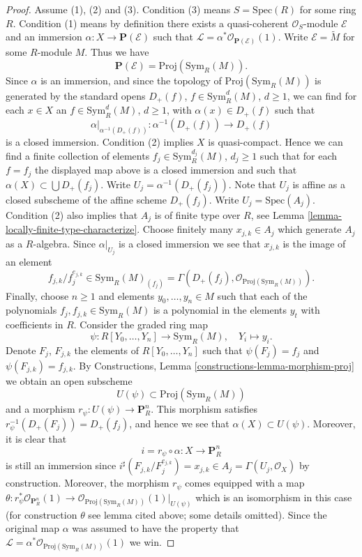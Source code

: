 \begin{proof}
Assume (1), (2) and (3).
Condition (3) means $S = \text{Spec}(R)$ for some ring $R$.
Condition (1) means by definition
there exists a quasi-coherent $\mathcal{O}_S$-module
$\mathcal{E}$ and an immersion $\alpha : X \to \mathbf{P}(\mathcal{E})$
such that $\mathcal{L} = \alpha^*\mathcal{O}_{\mathbf{P}(\mathcal{E})}(1)$.
Write $\mathcal{E} = \widetilde{M}$ for some $R$-module $M$.
Thus we have
$$
\mathbf{P}(\mathcal{E}) = \text{Proj}(\text{Sym}_R(M)).
$$
Since $\alpha$ is an immersion, and since the topology of
$\text{Proj}(\text{Sym}_R(M))$ is generated by the standard
opens $D_{+}(f)$, $f \in \text{Sym}_R^d(M)$, $d \geq 1$,
we can find for each $x \in X$ an
$f \in \text{Sym}_R^d(M)$, $d \geq 1$, with $\alpha(x) \in D_{+}(f)$
such that
$$
\alpha|_{\alpha^{-1}(D_{+}(f))} : \alpha^{-1}(D_{+}(f)) \to D_{+}(f)
$$
is a closed immersion. 
Condition (2) implies $X$ is quasi-compact. Hence we can find
a finite collection of elements
$f_j \in \text{Sym}_R^{d_j}(M)$, $d_j \geq 1$
such that for each $f = f_j$ the displayed map above
is a closed immersion and such that $\alpha(X) \subset \bigcup D_{+}(f_j)$.
Write $U_j = \alpha^{-1}(D_{+}(f_j))$. Note that $U_j$ is affine
as a closed subscheme of the affine scheme $D_{+}(f_j)$.
Write $U_j = \text{Spec}(A_j)$. Condition (2) also implies that
$A_j$ is of finite type over $R$, see
Lemma \ref{lemma-locally-finite-type-characterize}.
Choose finitely many $x_{j, k} \in A_j$ which
generate $A_j$ as a $R$-algebra. Since $\alpha|_{U_j}$ is a closed
immersion we see that $x_{j, k}$ is the image of an element
$$
f_{j, k}/f_j^{e_{j, k}} \in \text{Sym}_R(M)_{(f_j)}
=
\Gamma(D_{+}(f_j), \mathcal{O}_{\text{Proj}(\text{Sym}_R(M))}).
$$
Finally, choose $n \geq 1$ and elements $y_0, \ldots, y_n \in M$ such that each
of the polynomials $f_j, f_{j, k} \in \text{Sym}_R(M)$ is a polynomial
in the elements $y_t$ with coefficients in $R$.
Consider the graded ring map
$$
\psi : R[Y_0, \ldots, Y_n] \longrightarrow \text{Sym}_R(M),
\quad Y_i \longmapsto y_i.
$$
Denote $F_j$, $F_{j, k}$ the elements of $R[Y_0, \ldots, Y_n]$ such
that $\psi(F_j) = f_j$ and $\psi(F_{j, k}) = f_{j, k}$.
By Constructions, Lemma \ref{constructions-lemma-morphism-proj}
we obtain an open subscheme
$$
U(\psi) \subset \text{Proj}(\text{Sym}_R(M))
$$
and a morphism
$r_\psi : U(\psi) \to \mathbf{P}^n_R$. This morphism
satisfies $r_\psi^{-1}(D_{+}(F_j)) = D_{+}(f_j)$, and hence we see
that $\alpha(X) \subset U(\psi)$. Moreover, it is clear
that
$$
i = r_\psi \circ \alpha : X \longrightarrow \mathbf{P}^n_R
$$
is still an immersion since
$i^\sharp(F_{j, k}/F_j^{e_{j, k}}) = x_{j, k} \in
A_j = \Gamma(U_j, \mathcal{O}_X)$
by construction. Moreover, the morphism $r_\psi$ comes
equipped with a map
$\theta : r_\psi^*\mathcal{O}_{\mathbf{P}^n_R}(1)
\to \mathcal{O}_{\text{Proj}(\text{Sym}_R(M))}(1)|_{U(\psi)}$
which is an isomorphism in this case (for construction $\theta$
see lemma cited above; some details omitted).
Since the original map $\alpha$ was assumed to have the 
property that
$\mathcal{L} = \alpha^*\mathcal{O}_{\text{Proj}(\text{Sym}_R(M))}(1)$
we win.
\end{proof}


